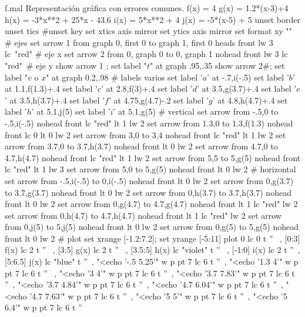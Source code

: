 \begin{plot}{.9}{f.mal}
  {Representación gráfica con errores comunes.}
  f(x) = 4
  g(x) = 1.2*(x-3)+4
  h(x) = -3*x**2 + 25*x - 43.6
  i(x) = 5*x**2 + 4
  j(x) = -5*(x-5) + 5
  unset border
  unset tics
  #unset key
  set xtics axis mirror
  set ytics axis mirror
  set format xy ""
  # ejes
  set arrow 1 from graph 0, first 0 to graph 1, first 0 heads front lw 3 lc\
  "red" # eje x
  set arrow 2 from 0, graph 0 to 0, graph 1 nohead front lw 3 lc "red"\
  # eje y 
  show arrow 1 ; set label "$t$" at graph .95,.35
  show arrow 2#; set label "$v$ o $x$" at graph 0.2,.98 
  # labels varios
  set label '$a$' at -.7,i(-.5) 
  set label '$b$' at 1.1,f(1.3)+.4
  set label '$c$' at 2.8,f(3)+.4
  set label '$d$' at 3.5,g(3.7)+.4
  set label '$e$' at 3.5,h(3.7)+.4
  set label '$f$' at 4.75,g(4.7)-.2 
  set label '$g$' at 4.8,h(4.7)+.4 
  set label '$h$' at 5.1,j(5)
  set label '$i$' at 5.1,g(5)
  # vertical
  set arrow from -.5,0 to -.5,i(-.5) nohead front lc "red" lt 1 lw 2 
  set arrow from 1.3,0 to 1.3,f(1.3) nohead front lc 0 lt 0 lw 2 
  set arrow from 3,0 to 3,4 nohead front lc "red" lt 1 lw 2
  set arrow from 3.7,0 to 3.7,h(3.7) nohead front  lt 0 lw 2 
  set arrow from 4.7,0 to 4.7,h(4.7) nohead front lc "red" lt 1 lw 2 
  set arrow from 5,5 to 5,g(5) nohead front lc "red" lt 1 lw 3
  set arrow from 5,0 to 5,g(5) nohead front lt 0 lw 2
  # horizontal
  set arrow from -.5,i(-.5) to 0,i(-.5) nohead front lt 0 lw 2
  set arrow from 0,g(3.7) to 3.7,g(3.7) nohead front lt 0 lw 2
  set arrow from 0,h(3.7) to 3.7,h(3.7) nohead front lt 0 lw 2
  set arrow from 0,g(4.7) to 4.7,g(4.7) nohead front lt 1 lc "red" lw 2
  set arrow from 0,h(4.7) to 4.7,h(4.7) nohead front lt 1 lc "red" lw 2
  set arrow from 0,j(5) to 5,j(5) nohead front lt 0 lw 2
  set arrow from 0,g(5) to 5,g(5) nohead front lt 0 lw 2
  # plot
  set xrange [-1.2:7.2]; set yrange [-5:11]
  plot 0 lc 0 t '' \
  , [0:3] f(x) lc 2 t '' \
  , [3:5] g(x) lc 2 t '' \
  , [3.5:5] h(x) lc "violet" t '' \
  , [-1:0] i(x) lc 2 t ''\
  , [5:6.5] j(x) lc "blue" t ''\
  , "<echo '-.5 5.25'" w p pt 7 lc 6 t ''\
  , "<echo '1.3 4'" w p pt 7 lc 6 t '' \
  , "<echo '3 4'" w p pt 7 lc 6 t ''\
  , "<echo '3.7 7.83'" w p pt 7 lc 6 t ''\
  , "<echo '3.7 4.84'" w p pt 7 lc 6 t ''\
  , "<echo '4.7 6.04'" w p pt 7 lc 6 t ''\
  , "<echo '4.7 7.63'" w p pt 7 lc 6 t ''\
  , "<echo '5 5'" w p pt 7 lc 6 t ''\
  , "<echo '5 6.4'" w p pt 7 lc 6 t ''\
\end{plot}

